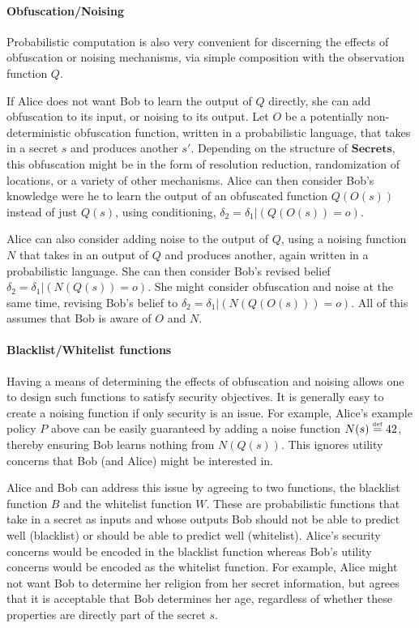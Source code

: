 \documentclass{article} %
\newcommand{\secrets}[0]{\textbf{Secrets}}
\newcommand{\paren}[1]{\left( #1 \right)}
\newcommand{\cond}[0]{|}
\newcommand{\stacklabel}[1]{\stackrel{\smash{\scriptscriptstyle \mathrm{#1}}}}
\newcommand{\defeq}{\stacklabel{def}=}
\theoremstyle{plain} %
\theoremstyle{definition} %
\begin{document}
\paragraph*{Obfuscation/Noising} Probabilistic computation is also very
convenient for discerning the effects of obfuscation or noising
mechanisms, via simple composition with the observation function $ Q
$.

If Alice does not want Bob to learn the output of $ Q $ directly, she
can add obfuscation to its input, or noising to its output. Let $ O $
be a potentially non-deterministic obfuscation function, written in a
probabilistic language, that takes in a secret $ s $ and produces
another $ s' $. Depending on the structure of $ \secrets $, this
obfuscation might be in the form of resolution reduction,
randomization of locations, or a variety of other mechanisms. Alice
can then consider Bob's knowledge were he to learn the output of an
obfuscated function $ Q(O(s)) $ instead of just $ Q(s) $, using
conditioning, $ \delta_2 = \delta_1 \cond \paren{Q(O(s)) = o} $.

Alice can also consider adding noise to the output of $ Q $, using a
noising function $ N $ that takes in an output of $ Q $ and produces
another, again written in a probabilistic language. She can then
consider Bob's revised belief $ \delta_2 = \delta_1 \cond
\paren{N(Q(s)) = o} $. She might consider obfuscation and noise at the
same time, revising Bob's belief to $ \delta_2 = \delta_1 \cond
\paren{N(Q(O(s))) = o} $. All of this assumes that Bob is aware of $ O
$ and $ N $.

\paragraph*{Blacklist/Whitelist functions} Having a means of
determining the effects of obfuscation and noising allows one to
design such functions to satisfy security objectives. It is
generally easy to create a noising function if only security is an
issue. For example, Alice's example policy $ P $ above can be easily
guaranteed by adding a noise function $ N(s) \defeq 42 $,
thereby ensuring Bob learns nothing from $ N(Q(s)) $. This ignores
utility concerns that Bob (and Alice) might be interested in.

Alice and Bob can address this issue by agreeing to two functions, the
blacklist function $ B $ and the whitelist function $ W $. These are
probabilistic functions that take in a secret as inputs and whose
outputs Bob should not be able to predict well (blacklist) or should
be able to predict well (whitelist). Alice's security concerns would
be encoded in the blacklist function whereas Bob's utility concerns
would be encoded as the whitelist function. For example, Alice might
not want Bob to determine her religion from her secret information,
but agrees that it is acceptable that Bob determines her age,
regardless of whether these properties are directly part of the secret
$ s $.
\end{document}
